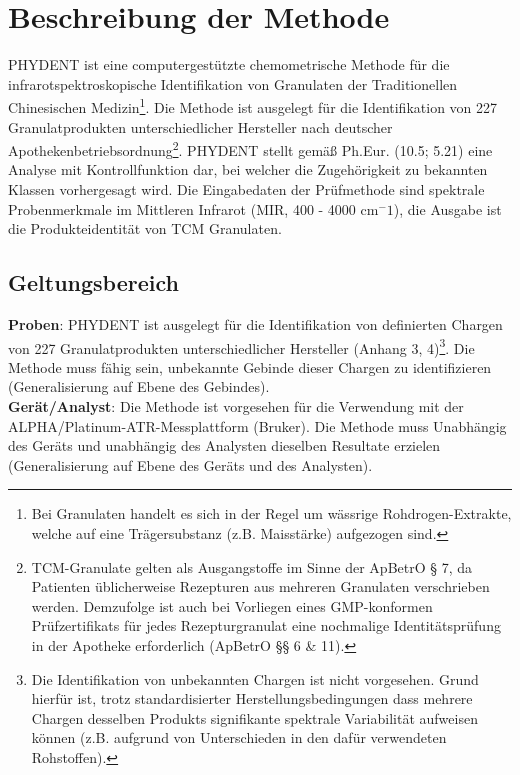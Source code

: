 \documentclass[11pt, a4paper]{article}
\newcommand\VersionPhEur{10.5}
\begin{document}
\newpage
\tableofcontents

\newpage

\section{Beschreibung der Methode}
PHYDENT ist eine computergestützte chemometrische Methode für die infrarotspektroskopische Identifikation von Granulaten der Traditionellen Chinesischen Medizin\footnote{Bei Granulaten handelt es sich in der Regel um wässrige Rohdrogen-Extrakte, welche auf eine Trägersubstanz (z.B. Maisstärke) aufgezogen sind.}. Die Methode ist ausgelegt für die Identifikation von 227 Granulatprodukten unterschiedlicher Hersteller nach deutscher Apothekenbetriebsordnung\footnote{TCM-Granulate gelten als Ausgangstoffe im Sinne der ApBetrO § 7, da Patienten üblicherweise Rezepturen aus mehreren Granulaten verschrieben werden. Demzufolge ist auch bei Vorliegen eines GMP-konformen Prüfzertifikats für jedes Rezepturgranulat eine nochmalige Identitätsprüfung in der Apotheke erforderlich (ApBetrO §§ 6 \& 11).}.  PHYDENT stellt gemäß Ph.Eur. (\VersionPhEur; 5.21) eine Analyse mit Kontrollfunktion dar, bei welcher die Zugehörigkeit zu bekannten Klassen vorhergesagt wird. Die Eingabedaten der Prüfmethode sind spektrale Probenmerkmale im Mittleren Infrarot (MIR, 400 - 4000 cm$^-{1}$), die Ausgabe ist die Produkteidentität von TCM Granulaten.


\subsection{Geltungsbereich}

\textbf{Proben}: PHYDENT ist ausgelegt für die Identifikation von definierten Chargen von 227 Granulatprodukten unterschiedlicher Hersteller (Anhang 3, 4)\footnote{Die Identifikation von unbekannten Chargen ist nicht vorgesehen. Grund hierfür ist, trotz standardisierter Herstellungsbedingungen dass mehrere Chargen desselben Produkts signifikante spektrale Variabilität aufweisen können (z.B. aufgrund von Unterschieden in den dafür verwendeten Rohstoffen).}.  Die Methode muss fähig sein, unbekannte Gebinde dieser Chargen zu identifizieren (Generalisierung auf Ebene des Gebindes). \\

\textbf{Gerät/Analyst}: Die Methode ist vorgesehen für die Verwendung mit der ALPHA/Platinum-ATR-Messplattform (Bruker). Die Methode muss Unabhängig des Geräts und unabhängig des Analysten dieselben Resultate erzielen (Generalisierung auf Ebene des Geräts und des Analysten).
\end{document}
